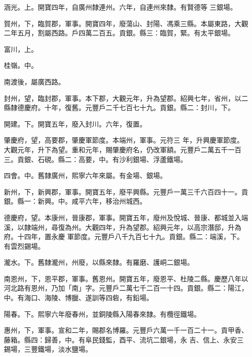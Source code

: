 \begin{pinyinscope}
 涵光。上。開寶四年，自廣州隸連州。六年，自連州來隸。有賢德等
 三銀場。



 賀州，下，臨賀郡，軍事。開寶四年，廢蕩山、封陽、馮乘三縣。本屬東路，大觀二年五月，割屬西路。戶四萬二百五。貢銀。縣三：臨賀，緊。有太平銀場。



 富川，上。



 桂嶺。中。



 南渡後，屬廣西路。



 封州，望，臨封郡，軍事。本下郡，大觀元年，升為望郡。紹興七年，省州，以二縣隸德慶府。十年，復舊。元豐戶二千七百七十九。貢銀。縣二：封川，下。



 開建。下。開寶五年，廢入封川。六年，復置。



 肇慶府，望，高要郡，肇慶軍節度。本端州，軍事。元符三
 年，升興慶軍節度。大觀元年，升下為望。重和元年，賜肇慶府名，仍改軍額。元豐戶二萬五千一百三。貢銀、石硯。縣二：高要，中。有沙利銀場、浮蘆鐵場。



 四會。中。舊隸廣州，熙寧六年來屬。有金場、銀場。



 新州，下，新興郡，軍事。開寶五年，廢平興縣。元豐戶一萬三千六百四十一。貢銀。縣一：新興。中。咸平六年，移治州城西。



 德慶府，望。本康州，晉康郡，軍事。開寶五年，廢州及悅城、晉康、都城並入端溪，以隸端州，尋復為州。大觀四年，升為望郡。紹興元年，以高宗潛邸，升為府。十四年，置永慶
 軍節度。元豐戶八千九百七十九。貢銀。縣二：端溪，下。有雲烈錫場。



 瀧水。下。舊隸瀧州，州廢，以縣來隸。有羅磨、護峒二銀場。



 南恩州，下，恩平郡，軍事。舊恩州。開寶五年，廢恩平、杜陵二縣。慶歷八年以河北路有恩州，乃加「南」字。元豐戶二萬七千二百一十四。貢銀。縣二：陽江，中。有海口、海陵、博臘、遂訓等四砦，有鉛場。



 陽春。下。熙寧六年廢春州，並銅陵縣入陽春來隸。有欖徑鐵場。



 惠州，下，軍事。宣和二年，賜郡名博羅。元豐戶六萬一千一百二十一。貢甲香、藤箱。縣四：歸善，中。有阜民錢監，酉平、流坑二銀場，永
 吉、信上、永安三錫場，三豐鐵場，淡水鹽場。




\end{pinyinscope}
